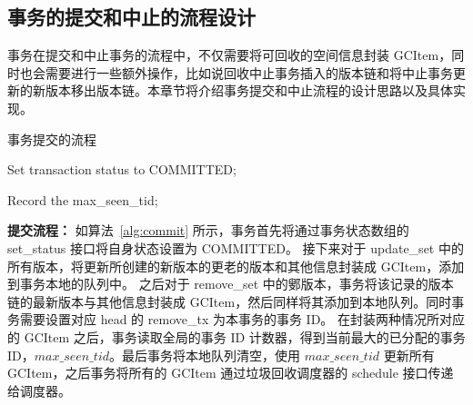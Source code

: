 \subsection{事务的提交和中止的流程设计}
\label{ssec:commit-abort}

事务在提交和中止事务的流程中，不仅需要将可回收的空间信息封装 GCItem，同时也会需要进行一些额外操作，比如说回收中止事务插入的版本链和将中止事务更新的新版本移出版本链。本章节将介绍事务提交和中止流程的设计思路以及具体实现。

\begin{algorithm}[h]
    \caption{事务提交的流程}
    \label{alg:commit}
    \BlankLine
    Set transaction status to COMMITTED;



    Record the max\_seen\_tid;



\end{algorithm}

\textbf{提交流程：} 如算法~\ref{alg:commit} 所示，事务首先将通过事务状态数组的 set\_status 接口将自身状态设置为 COMMITTED。
接下来对于 update\_set 中的所有版本，将更新所创建的新版本的更老的版本和其他信息封装成 GCItem，添加到事务本地的队列中。
之后对于 remove\_set 中的鄋版本，事务将该记录的版本链的最新版本与其他信息封装成 GCItem，然后同样将其添加到本地队列。同时事务需要设置对应 head 的 remove\_tx 为本事务的事务 ID。
在封装两种情况所对应的 GCItem 之后，事务读取全局的事务 ID 计数器，得到当前最大的已分配的事务 ID，$max\_seen\_tid$。最后事务将本地队列清空，使用 $max\_seen\_tid$ 更新所有 GCItem，之后事务将所有的 GCItem 通过垃圾回收调度器的 schedule 接口传递给调度器。


